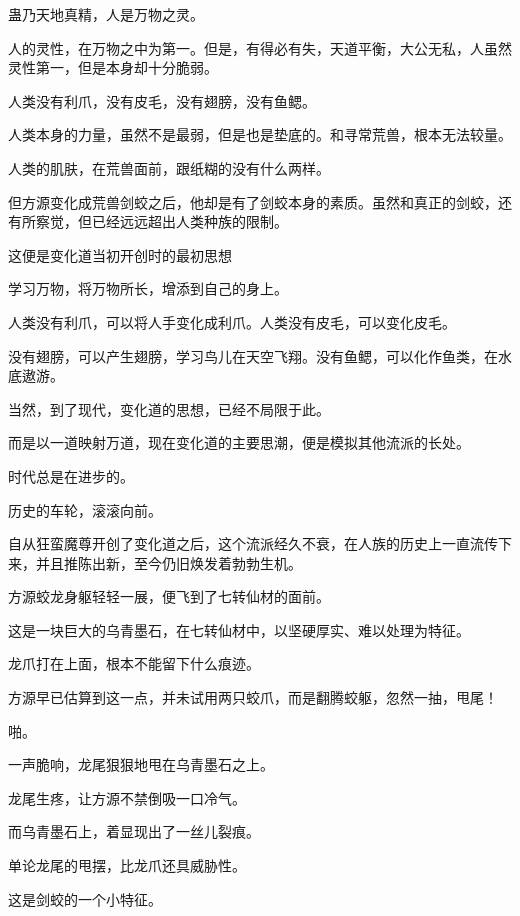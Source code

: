 
\begin{this_body}

蛊乃天地真精，人是万物之灵。

人的灵性，在万物之中为第一。但是，有得必有失，天道平衡，大公无私，人虽然灵性第一，但是本身却十分脆弱。

人类没有利爪，没有皮毛，没有翅膀，没有鱼鳃。

人类本身的力量，虽然不是最弱，但是也是垫底的。和寻常荒兽，根本无法较量。

人类的肌肤，在荒兽面前，跟纸糊的没有什么两样。

但方源变化成荒兽剑蛟之后，他却是有了剑蛟本身的素质。虽然和真正的剑蛟，还有所察觉，但已经远远超出人类种族的限制。

这便是变化道当初开创时的最初思想

学习万物，将万物所长，增添到自己的身上。

人类没有利爪，可以将人手变化成利爪。人类没有皮毛，可以变化皮毛。

没有翅膀，可以产生翅膀，学习鸟儿在天空飞翔。没有鱼鳃，可以化作鱼类，在水底遨游。

当然，到了现代，变化道的思想，已经不局限于此。

而是以一道映射万道，现在变化道的主要思潮，便是模拟其他流派的长处。

时代总是在进步的。

历史的车轮，滚滚向前。

自从狂蛮魔尊开创了变化道之后，这个流派经久不衰，在人族的历史上一直流传下来，并且推陈出新，至今仍旧焕发着勃勃生机。

方源蛟龙身躯轻轻一展，便飞到了七转仙材的面前。

这是一块巨大的乌青墨石，在七转仙材中，以坚硬厚实、难以处理为特征。

龙爪打在上面，根本不能留下什么痕迹。

方源早已估算到这一点，并未试用两只蛟爪，而是翻腾蛟躯，忽然一抽，甩尾！

啪。

一声脆响，龙尾狠狠地甩在乌青墨石之上。

龙尾生疼，让方源不禁倒吸一口冷气。

而乌青墨石上，着显现出了一丝儿裂痕。

单论龙尾的甩摆，比龙爪还具威胁性。

这是剑蛟的一个小特征。


\end{this_body}
